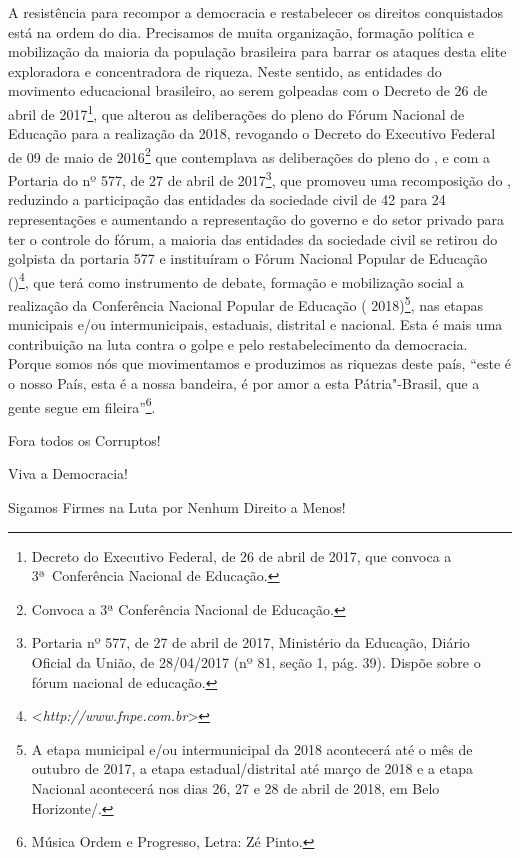A resistência para recompor a democracia e restabelecer os direitos
conquistados está na ordem do dia. Precisamos de muita organização,
formação política e mobilização da maioria da população brasileira para
barrar os ataques desta elite exploradora e concentradora de riqueza.
Neste sentido, as entidades do movimento educacional brasileiro, ao
serem golpeadas com o Decreto de 26 de abril de 2017\footnote{Decreto
  do Executivo Federal, de 26 de abril de 2017, que convoca a
  3ª~Conferência Nacional de Educação.}, que alterou as
deliberações do pleno do Fórum Nacional de Educação para a realização da
 2018, revogando o Decreto do Executivo Federal de 09 de maio de
2016\footnote{Convoca a 3ª Conferência Nacional de Educação.} que contemplava
as deliberações do pleno do , e com a Portaria do  nº 577, de 27
de abril de 2017\footnote{Portaria nº 577, de 27 de abril de
  2017, Ministério da Educação, Diário Oficial da União, de 28/04/2017
  (nº 81, seção 1, pág. 39). Dispõe sobre o fórum nacional de
  educação.},
que promoveu uma recomposição do , reduzindo a participação das
entidades da sociedade civil de 42 para 24 representações e aumentando a
representação do governo e do setor privado para ter o controle do
fórum, a maioria das entidades da sociedade civil se retirou do 
golpista da portaria 577 e instituíram o Fórum Nacional Popular de
Educação ()\footnote{\textless{}\emph{http://www.fnpe.com.br}\textgreater{}},
que terá como instrumento de debate, formação e mobilização social a
realização da Conferência Nacional Popular de Educação (
2018)\footnote{A etapa municipal e/ou intermunicipal da 
  2018 acontecerá até o mês de outubro de 2017, a etapa
  estadual/distrital até março de 2018 e a etapa Nacional acontecerá nos
  dias 26, 27 e 28 de abril de 2018, em Belo Horizonte/.}, nas etapas
municipais e/ou intermunicipais, estaduais, distrital e nacional. Esta é
mais uma contribuição na luta contra o golpe e pelo restabelecimento da
democracia. Porque somos nós que movimentamos e produzimos as riquezas
deste país, ``este é o nosso País, esta é a nossa bandeira, é por amor a
esta Pátria"-Brasil, que a gente segue em fileira''\footnote{Música Ordem
  e Progresso, Letra: Zé Pinto.}.

Fora todos os Corruptos!

Viva a Democracia!

Sigamos Firmes na Luta por Nenhum Direito a Menos!
